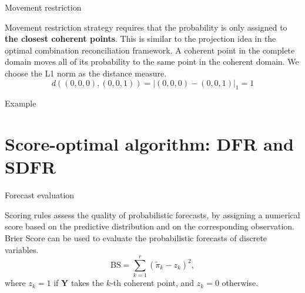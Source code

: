 \documentclass[12pt]{beamer}
\begin{document}
\begin{frame}{Movement restriction}

\begin{outline}
\0 Movement restriction strategy requires that the probability is only assigned to \textbf{the closest coherent points}.
\1 This is similar to the projection idea in the optimal combination reconciliation framework.    
\1 A coherent point in the complete domain moves all of its probability to the same point in the coherent domain.
\1 We choose the L1 norm as the distance measure.
\[
    d((0, 0, 0), (0, 0, 1)) = |(0,0,0) - (0,0,1)|_1 = 1  
\]
\end{outline}
\vspace{-3mm}
\begin{block}{Example}\end{block}
\end{frame}

\section{Score-optimal algorithm: DFR and SDFR}

\begin{frame}{Forecast evaluation}

    \begin{outline}
        \1 Scoring rules assess the quality of probabilistic forecasts, by assigning a numerical score based on the predictive distribution and on the corresponding observation.
        \1 Brier Score can be used to evaluate the probabilistic forecasts of discrete variables.
        \[
          \text{BS} = \sum_{k=1}^r (\tilde{\pi}_k - {z}_k)^2,
        \]
        where $z_k = 1$ if $\mathbf{Y}$ takes the $k$-th coherent point, and $z_k = 0$ otherwise.
    \end{outline}
\end{frame}
\end{document}
